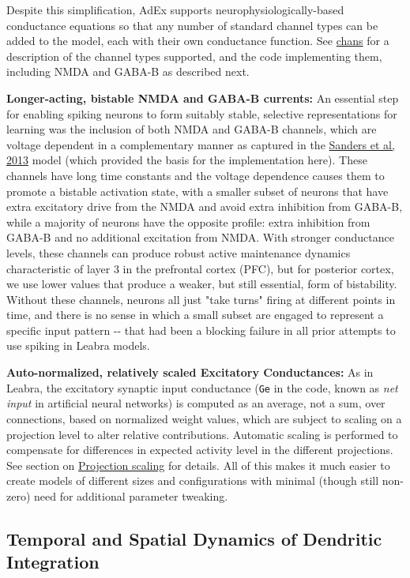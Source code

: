 \documentclass[11pt,twoside]{article}
\newif\myifpdf
\begin{document}
Despite this simplification, AdEx supports neurophysiologically-based conductance equations so that any number of standard channel types can be added to the model, each with their own conductance function. See \href{https://github.com/emer/axon/tree/master/chans}{chans} for a description of the channel types supported, and the code implementing them, including NMDA and GABA-B as described next.

\textbf{Longer-acting, bistable NMDA and GABA-B currents:} An essential step for enabling spiking neurons to form suitably stable, selective representations for learning was the inclusion of both NMDA and GABA-B channels, which are voltage dependent in a complementary manner as captured in the \protect\hyperlink{References}{Sanders et al, 2013} model (which provided the basis for the implementation here). These channels have long time constants and the voltage dependence causes them to promote a bistable activation state, with a smaller subset of neurons that have extra excitatory drive from the NMDA and avoid extra inhibition from GABA-B, while a majority of neurons have the opposite profile: extra inhibition from GABA-B and no additional excitation from NMDA. With stronger conductance levels, these channels can produce robust active maintenance dynamics characteristic of layer 3 in the prefrontal cortex (PFC), but for posterior cortex, we use lower values that produce a weaker, but still essential, form of bistability. Without these channels, neurons all just "take turns" firing at different points in time, and there is no sense in which a small subset are engaged to represent a specific input pattern -\/- that had been a blocking failure in all prior attempts to use spiking in Leabra models.

\textbf{Auto-normalized, relatively scaled Excitatory Conductances:} As in Leabra, the excitatory synaptic input conductance (\texttt{Ge} in the code, known as \emph{net input} in artificial neural networks) is computed as an average, not a sum, over connections, based on normalized weight values, which are subject to scaling on a projection level to alter relative contributions. Automatic scaling is performed to compensate for differences in expected activity level in the different projections. See section on \protect\hyperlink{projection-scaling}{Projection scaling} for details. All of this makes it much easier to create models of different sizes and configurations with minimal (though still non-zero) need for additional parameter tweaking. 

\subsection{Temporal and Spatial Dynamics of Dendritic Integration}
\end{document}
